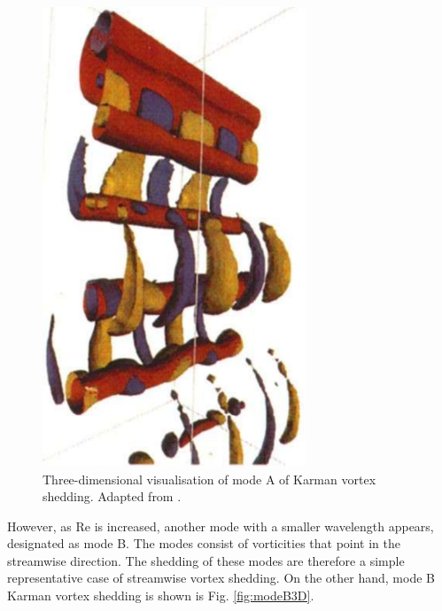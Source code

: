 \documentclass[oneside]{utmthesis}
\begin{document}
\begin{figure}[!h]
  \centering
  \hspace{1cm} \includegraphics[angle=90,width=0.7\textwidth]{figs/modeA3D}
    \caption{Three-dimensional visualisation of mode A of Karman vortex shedding. Adapted from \citet{Thompson1994}.}
    \label{fig:modeA3D}
  \end{figure}

However, as Re is increased, another mode with a smaller wavelength appears, designated as mode B. The modes consist of vorticities that point in the streamwise direction. The shedding of these modes are therefore a simple representative case of streamwise vortex shedding. On the other hand, mode B Karman vortex shedding is shown is Fig. \ref{fig:modeB3D}.
\end{document}
